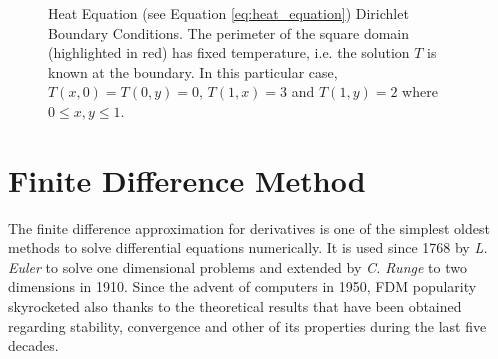     \begin{center}
	\begin{figure}
    	 
    	\caption[Heat Equation - Dirichlet Boundary Conditions]{Heat Equation (see Equation \ref{eq:heat_equation}) Dirichlet Boundary Conditions. The perimeter of the square domain (highlighted in red) has fixed temperature, i.e. the solution $T$ is known at the boundary. In this particular case, $T(x,0)=T(0,y)=0$, $T(1,x)=3$ and $T(1,y)=2$ where $0\leq x,y\leq 1$. }
    	\label{fig:heat2d_bc}
	\end{figure}
\end{center} 

\section{Finite Difference Method}
The finite difference approximation for derivatives is one of the simplest oldest methods to solve differential equations numerically. It is used since 1768 by \textit{L. Euler} to solve one dimensional problems and extended by \textit{C. Runge} to two dimensions in 1910. Since the advent of computers in 1950, FDM  popularity skyrocketed also thanks to the theoretical results that have been obtained regarding stability, convergence and other of its properties during the last five decades.


